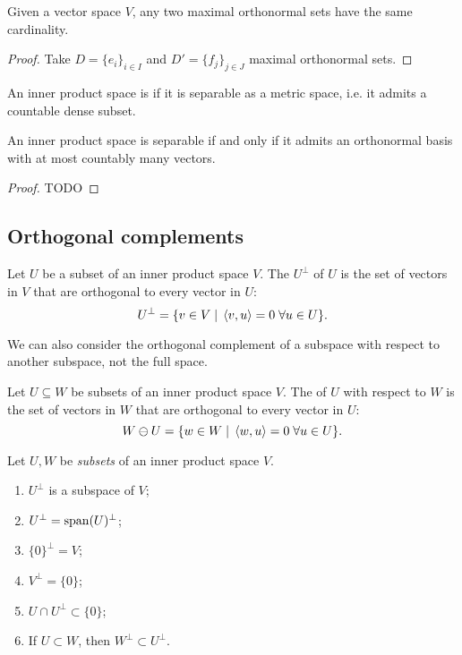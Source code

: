 \begin{proposition}
Given a vector space $V$, any two maximal orthonormal sets have the same cardinality.
\end{proposition}
\begin{proof}
Take $D = \{e_i\}_{i\in I}$ and $D' = \{f_j\}_{j\in J}$ maximal orthonormal sets.
\end{proof}
\begin{definition}
An inner product space is  if it is separable as a metric space, i.e. it admits a countable dense subset.
\end{definition}
\begin{proposition}
An inner product space is separable \textup{if and only if} it admits an orthonormal basis with at most countably many vectors.
\end{proposition}
\begin{proof}
TODO
\end{proof}

\subsection{Orthogonal complements}
\begin{definition}
Let $U$ be a subset of an inner product space $V$. The  $U^\perp$ of $U$ is the set of vectors in $V$ that are orthogonal to every vector in $U$:
\[ U^\perp = \{ v\in V\;|\; \left\langle v,u \right\rangle=0\; \forall u\in U \}. \]
\end{definition}
We can also consider the orthogonal complement of a subspace with respect to another subspace, not the full space.
\begin{definition}
Let $U\subseteq W$ be subsets of an inner product space $V$. The  of $U$ with respect to $W$ is the set of vectors in $W$ that are orthogonal to every vector in $U$:
\[ W\ominus U = \{ w\in W\;|\; \left\langle w,u \right\rangle=0\; \forall u\in U \}. \]
\end{definition}

\begin{proposition} \label{prop:OrthogonalComplementProperties}
Let $U,W$ be \emph{subsets} of an inner product space $V$.
\begin{enumerate}
\item $U^\perp$ is a subspace of $V$;
\item $U^\perp = \operatorname{span}(U)^\perp$;
\item $\{0\}^\perp = V$;
\item $V^\perp = \{0\}$;
\item $U\cap U^\perp \subset \{0\}$;
\item If $U\subset W$, then $W^\perp \subset U^\perp$.
\end{enumerate}
\end{proposition}

